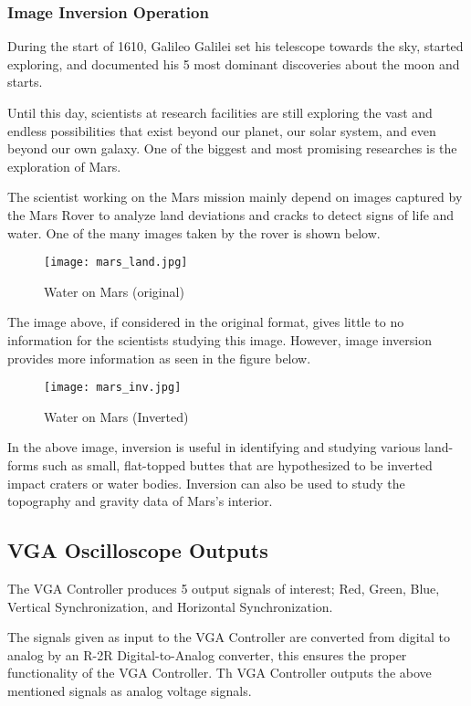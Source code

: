 \subsubsection{Image Inversion Operation}
\par During the start of 1610, Galileo Galilei set his telescope towards the sky, started exploring, and documented his 5 most dominant discoveries about the moon and starts. \newline
\par Until this day, scientists at research facilities are still exploring the vast and endless possibilities that exist beyond our planet, our solar system, and even beyond our own galaxy. One of the biggest and most promising researches is the exploration of Mars. \newline
\par The scientist working on the Mars mission mainly depend on images captured by the Mars Rover to analyze land deviations and cracks to detect signs of life and water. One of the many images taken by the rover is shown below. \newline

\begin{figure}[H]
	\centering
	\texttt{[image: mars\_land.jpg]}
	\caption{ Water on Mars (original) \cite{marsrover} }
	\label{fig:resultsmars}  
\end{figure}

\par The image above, if considered in the original format, gives little to no information for the scientists studying this image. However, image inversion provides more information as seen in the figure below. \newline

\begin{figure}[H]
	\centering
	\texttt{[image: mars\_inv.jpg]}
	\caption{ Water on Mars (Inverted) \cite{marsrover} }
	\label{fig:resultsmarsinv}  
\end{figure}

\par In the above image, inversion is useful in identifying and studying various land-forms such as small, flat-topped buttes that are hypothesized to be inverted impact craters or water bodies. Inversion can also be used to study the topography and gravity data of Mars’s interior. \newline

\subsection{VGA Oscilloscope Outputs}
\par The VGA Controller produces 5 output signals of interest; Red, Green, Blue, Vertical Synchronization, and Horizontal Synchronization. \newline
\par The signals given as input to the VGA Controller are converted from digital to analog by an R-2R Digital-to-Analog converter, this ensures the proper functionality of the VGA Controller. Th VGA Controller outputs the above mentioned signals as analog voltage signals. \newline

